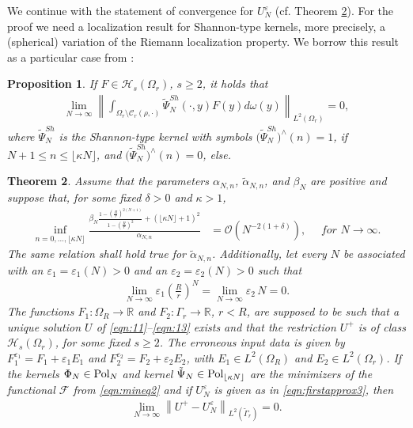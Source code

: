 \documentclass[a4paper, 10pt]{article}
\numberwithin{equation}{section}
\newtheorem{thm}{Theorem}[section]
\newtheorem{prop}[thm]{Proposition}
\theoremstyle{definition}
\newcommand{\eps}{\ensuremath{\varepsilon}}
\begin{document}
We continue with the statement of convergence for $U_N^\varepsilon$ (cf. Theorem \ref{thm:convres}). For the proof we need a localization result for Shannon-type kernels, more precisely, a (spherical) variation of the Riemann localization property. We borrow this result as a particular case from \cite{yuguang13}:

\begin{prop}\label{prop:loc1} 
If $F\in\mathcal{H}_s(\Omega_r)$, $s\geq 2$, it holds that
\begin{align}\label{eqn:locprop}
\lim_{N\to\infty}\left\|\int_{\Omega_r\setminus\mathcal{C}_r(\rho,\cdot)}\tilde{\Psi}^{Sh}_N(\cdot,y)F(y)d\omega(y)\right\|_{L^2 (\Omega_r)}=0,
\end{align}
where $\tilde{\Psi}^{Sh}_N$ is the Shannon-type kernel with symbols $\big(\tilde{\Psi}_N^{Sh}\big)^\wedge(n)=1$, if $N +1\leq n\leq \lfloor\kappa N\rfloor$, and $\big(\tilde{\Psi}_N^{Sh}\big)^\wedge(n)=0$, else.
\end{prop}

\begin{thm}\label{thm:convres}
Assume that the parameters $\alpha_{N,n}$, $\tilde{\alpha}_{N,n}$, and $\beta_N$ are positive and suppose that, for some fixed $\delta>0$ and $\kappa>1$,
\begin{align}
\inf_{n=0,\ldots, \lfloor\kappa N\rfloor}\frac{\beta_N\frac{1-\left(\frac{R}{r}\right)^{2(N+1)}}{1-\left(\frac{R}{r}\right)^2}+( \lfloor\kappa N\rfloor+1)^2}{{\alpha}_{N,n}}&=\mathcal{O}\left(N^{-2(1+\delta)}\right),\quad \textit{ for }N\to\infty.\label{eqn:ass1}
\end{align}
The same relation shall hold true for $\tilde{\alpha}_{N,n}$. Additionally, let every $N$ be associated with an $\varepsilon_1=\varepsilon_1(N)>0$ and an $\varepsilon_2=\varepsilon_2(N)>0$ such that 
\begin{align}
\lim_{N\to\infty}\varepsilon_1 \left(\frac{R}{r}\right)^{N}=\lim_{N\to\infty}\varepsilon_2 \,{N}=0.\label{eqn:propx}
\end{align}
The functions $F_1:\Omega_R\to\mathbb{R}$ and $F_2:\Gamma_r\to\mathbb{R}$, $r<R$, are supposed to be such that a unique solution $U$ of \eqref{eqn:11}--\eqref{eqn:13} exists and that the restriction $U^+$ is of class $\mathcal{H}_s(\Omega_r)$, for some fixed $s\geq 2$. The erroneous input data is given by $F_1^{\eps_1}=F_1+\eps_1 E_1$ and $F_2^{\eps_2}=F_2+\eps_2 E_2$, with $E_1\in L^2(\Omega_R)$ and $E_2\in L^2(\Omega_r)$. If the kernels $\Phi_N\in\textnormal{Pol}_{N}$ and kernel $\tilde{\Psi}_N\in\textnormal{Pol}_{ \lfloor\kappa N\rfloor}$ are the minimizers of the functional $\mathcal{F}$ from \eqref{eqn:mineq2} and if $U_N^\eps$ is given as in \eqref{eqn:firstapprox3}, then
\begin{align}
\lim_{N\to\infty}\left\|U^+-U_ {N}^{\varepsilon}\right\|_{L^2(\tilde{\Gamma}_r)}=0.\label{eqn:convres}
\end{align}
\end{thm}
\end{document}
